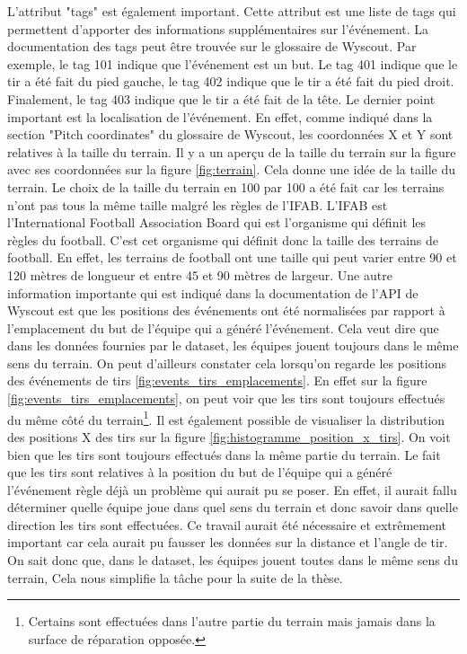 \documentclass[12pt]{article}
\begin{document}
\noindent L'attribut "tags" est également important.
Cette attribut est une liste de tags qui permettent d'apporter des informations supplémentaires sur l'événement.
La documentation des tags peut être trouvée sur le glossaire de Wyscout. \cite{WyscoutGlossary}
Par exemple, le tag 101 indique que l'événement est un but. 
Le tag 401 indique que le tir a été fait du pied gauche, le tag 402 indique que le tir a été fait du pied droit.
Finalement, le tag 403 indique que le tir a été fait de la tête.
\newline\newline
Le dernier point important est la localisation de l'événement.
En effet, comme indiqué dans la section "Pitch coordinates" du glossaire de Wyscout, \cite{WyscoutGlossary} les coordonnées X et Y sont relatives à la taille du terrain.
Il y a un aperçu de la taille du terrain sur la figure avec ses coordonnées sur la figure \ref{fig:terrain}.
Cela donne une idée de la taille du terrain.
Le choix de la taille du terrain en 100 par 100 a été fait car les terrains n'ont pas tous la même taille malgré les règles de l'IFAB.
\newline\newline
L'IFAB est l'International Football Association Board qui est l'organisme qui définit les règles du football. 
C'est cet organisme qui définit donc la taille des terrains de football.
En effet, les terrains de football ont une taille qui peut varier entre 90 et 120 mètres de longueur et entre 45 et 90 mètres de largeur. \cite{TerrainIFAB}
\newline\newline 
Une autre information importante qui est indiqué dans la documentation de l'API de Wyscout \cite{WyscoutAPI} est que les positions des événements ont été normalisées par rapport à l'emplacement du but de l'équipe qui a généré l'événement.
Cela veut dire que dans les données fournies par le dataset, les équipes jouent toujours dans le même sens du terrain.
On peut d'ailleurs constater cela lorsqu'on regarde les positions des événements de tirs \ref{fig:events_tirs_emplacements}.
En effet sur la figure \ref{fig:events_tirs_emplacements}, on peut voir que les tirs sont toujours effectués du même côté du terrain\footnote{Certains sont effectuées dans l'autre partie du terrain mais jamais dans la surface de réparation opposée.}.
Il est également possible de visualiser la distribution des positions X des tirs sur la figure \ref{fig:histogramme_position_x_tirs}.
On voit bien que les tirs sont toujours effectués dans la même partie du terrain.
Le fait que les tirs sont relatives à la position du but de l'équipe qui a généré l'événement règle déjà un problème qui aurait pu se poser.
En effet, il aurait fallu déterminer quelle équipe joue dans quel sens du terrain et donc savoir dans quelle direction les tirs sont effectuées.
Ce travail aurait été nécessaire et extrêmement important car cela aurait pu fausser les données sur la distance et l'angle de tir.
\newline\newline
On sait donc que, dans le dataset, les équipes jouent toutes dans le même sens du terrain, Cela nous simplifie la tâche pour la suite de la thèse.
\end{document}
